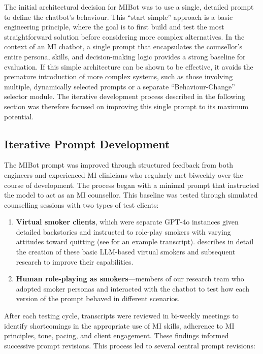 The initial architectural decision for MIBot was to use a single, detailed prompt to define the chatbot's behaviour. This ``start simple'' approach is a basic engineering principle, where the goal is to first build and test the most straightforward solution before considering more complex alternatives. In the context of an MI chatbot, a single prompt that encapsulates the counsellor's entire persona, skills, and decision-making logic provides a strong baseline for evaluation. If this simple architecture can be shown to be effective, it avoids the premature introduction of more complex systems, such as those involving multiple, dynamically selected prompts or a separate ``Behaviour-Change'' selector module. The iterative development process described in the following section was therefore focused on improving this single prompt to its maximum potential.

\subsection{Iterative Prompt Development}
The MIBot prompt was improved through structured feedback from both engineers and experienced MI clinicians who regularly met biweekly over the course of development. The process began with a minimal prompt that instructed the model to act as an MI counsellor. This baseline was tested through simulated counselling sessions with two types of test clients:

\begin{enumerate}
	\item \textbf{Virtual smoker clients}, which were separate GPT-4o instances given detailed backstories and instructed to role-play smokers with varying attitudes toward quitting (see  for an example transcript).  describes in detail the creation of these basic LLM-based virtual smokers and subsequent research to improve their capabilities.
	\item \textbf{Human role-playing as smokers}---members of our research team who adopted smoker personas and interacted with the chatbot to test how each version of the prompt behaved in different scenarios.
\end{enumerate}

After each testing cycle, transcripts were reviewed in bi-weekly meetings to identify shortcomings in the appropriate use of MI skills, adherence to MI principles, tone, pacing, and client engagement. These findings informed successive prompt revisions.
This process led to several central prompt revisions:


